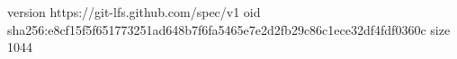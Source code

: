 version https://git-lfs.github.com/spec/v1
oid sha256:e8cf15f5f651773251ad648b7f6fa5465e7e2d2fb29c86c1ece32df4fdf0360c
size 1044
